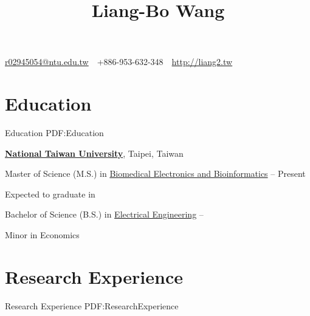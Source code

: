 \documentclass[a4paper,10pt,oneside]{article}
\begin{document}

\title{Liang-Bo Wang}

\begin{subtitle}
\href{mailto:r02945054@ntu.edu.tw}
{r02945054@ntu.edu.tw}
\,\BulletSymbol\,
+886-953-632-348
\,\BulletSymbol\,
\href{http://liang2.tw}
{http://liang2.tw}
\end{subtitle}

\begin{body}


\section
{Education}
{Education}
{PDF:Education}

\href{http://www.ntu.edu.tw/english/index.html}
{\textbf{National Taiwan University}},
Taipei, Taiwan
\par
Master of Science (M.S.) in
\href{http://www.bebi.ntu.edu.tw/English/index.html}
{Biomedical Electronics and Bioinformatics}
\hfill
{} -- Present
\begin{detail}
    \begin{detailitem}
    \item Expected to graduate in 
    \end{detailitem}
\end{detail}


\EntryGapNoBreak
Bachelor of Science (B.S.) in
\href{http://www.ee.ntu.edu.tw/en/}
{Electrical Engineering}
\hfill
{} --
\begin{detail}
    \begin{detailitem}
    \item Minor in Economics
    \end{detailitem}
\end{detail}


\section
{Research Experience}
{Research Experience}
{PDF:ResearchExperience}


\end{body}
\end{document}
